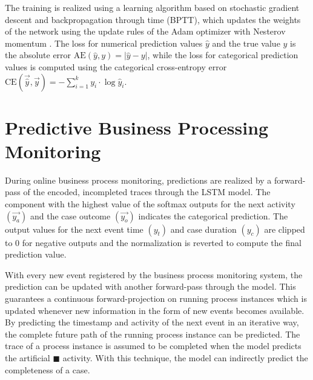 The training is realized using a learning algorithm based on stochastic gradient descent and backpropagation through time (BPTT), which updates the weights of the network using the update rules of the Adam optimizer with Nesterov momentum \cite{dozat2016incorporating}.
The loss for numerical prediction values $\hat{y}$ and the true value $y$ is the absolute error $\text{AE}(\hat{y},y)=|\hat{y} - y|$, while the loss for categorical prediction values is computed using the categorical cross-entropy error $\text{CE}(\vec{\hat{y}}, \vec{y}) = - \sum_{i=1}^{k} y_i \cdot \log \hat{y}_i$.

\section{Predictive Business Processing Monitoring}

During online business process monitoring, predictions are realized by a forward-pass of the encoded, incompleted traces through the LSTM model.
The component with the highest value of the softmax outputs for the next activity $(\vec{y_a})$ and the case outcome $(\vec{y_o})$ indicates the categorical prediction.
The output values for the next event time $(y_t)$ and case duration  $(y_c)$ are clipped to 0 for negative outputs and the normalization is reverted to compute the final prediction value.

With every new event registered by the business process monitoring system, the prediction can be updated with another forward-pass through the model.
This guarantees a continuous forward-projection on running process instances which is updated whenever new information in the form of new events becomes available.
By predicting the timestamp and activity of the next event in an iterative way, the complete future path of the running process instance can be predicted.
The trace of a process instance is assumed to be completed when the model predicts the artificial $\blacksquare$ activity.
With this technique, the model can indirectly predict the completeness of a case.